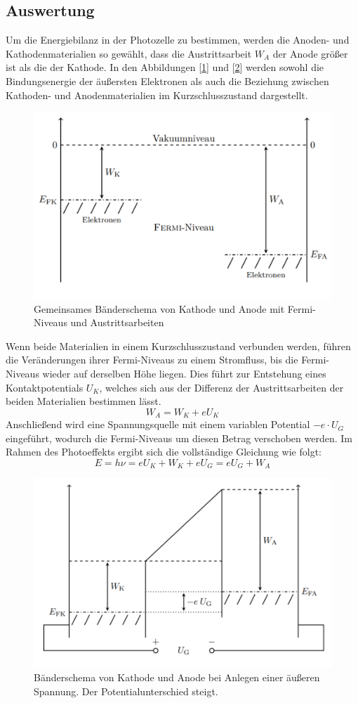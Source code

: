 \documentclass{article}
\begin{document}
\subsection{Auswertung}
Um die Energiebilanz in der Photozelle zu bestimmen, werden die Anoden- und Kathodenmaterialien 
so gewählt, dass die Austrittsarbeit \( W_A \) der Anode größer ist als die der Kathode. 
In den Abbildungen [\ref{fig:fermi}] und [\ref{fig:energie}] werden sowohl die Bindungsenergie 
der äußersten Elektronen als auch die Beziehung zwischen Kathoden- und Anodenmaterialien im 
Kurzschlusszustand dargestellt.
\begin{figure}[h!]
  \centering
  \includegraphics[width=.4\linewidth]{P402_fermi}
  \caption{Gemeinsames Bänderschema von Kathode und Anode mit Fermi-Niveaus und Austrittsarbeiten \cite{Anleitung}}
  \label{fig:fermi}
\end{figure}
Wenn beide Materialien in einem Kurzschlusszustand verbunden werden, führen die 
Veränderungen ihrer Fermi-Niveaus zu einem Stromfluss, bis die Fermi-Niveaus wieder 
auf derselben Höhe liegen. Dies führt zur Entstehung eines Kontaktpotentials \( U_K \),
 welches sich aus der Differenz der Austrittsarbeiten der beiden Materialien bestimmen lässt.
\[
W_A = W_K + eU_K
\]
Anschließend wird eine Spannungsquelle mit einem variablen Potential
 \( -e \cdot U_G \) eingeführt, wodurch die Fermi-Niveaus um diesen Betrag verschoben werden.
Im Rahmen des Photoeffekts ergibt sich die vollständige Gleichung wie folgt:
\begin{equation}
  E = h \nu = e U_{K} + W_K + e U_G = e U_G + W_A
  \label{eq:energie}
\end{equation}
\begin{figure}[h!]
  \centering
  \includegraphics[width=.4\linewidth]{P402_energie}
  \caption{Bänderschema von Kathode und Anode bei Anlegen einer äußeren Spannung.
  Der Potentialunterschied steigt. \cite{Anleitung}}
  \label{fig:energie}
\end{figure}
\newpage
\end{document}
